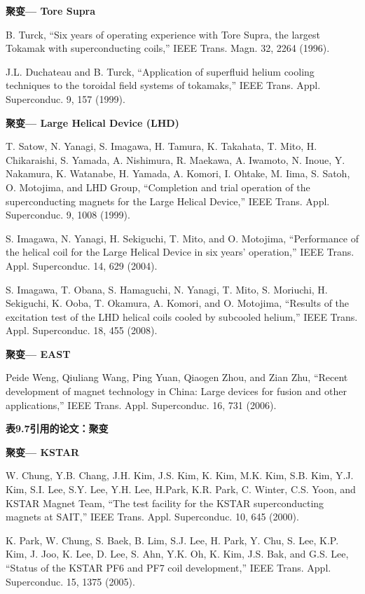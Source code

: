 \noindent \textbf{聚变--- Tore Supra }

\noindent [9.30] B. Turck, ``Six years of operating experience with Tore Supra, the largest Tokamak
with superconducting coils,” IEEE Trans. Magn. 32, 2264 (1996).

\noindent [9.31] J.L. Duchateau and B. Turck, ``Application of superfluid helium cooling techniques
to the toroidal field systems of tokamaks,” IEEE Trans. Appl. Superconduc. 9, 157
(1999).

\noindent \textbf{聚变--- Large Helical Device (LHD) }

\noindent [9.32] T. Satow, N. Yanagi, S. Imagawa, H. Tamura, K. Takahata, T. Mito, H. Chikaraishi,
S. Yamada, A. Nishimura, R. Maekawa, A. Iwamoto, N. Inoue, Y. Nakamura,
K. Watanabe, H. Yamada, A. Komori, I. Ohtake, M. Iima, S. Satoh, O. Motojima,
and LHD Group, ``Completion and trial operation of the superconducting magnets
for the Large Helical Device,” IEEE Trans. Appl. Superconduc. 9, 1008 (1999).

\noindent [9.33] S. Imagawa, N. Yanagi, H. Sekiguchi, T. Mito, and O. Motojima, ``Performance of
the helical coil for the Large Helical Device in six years’ operation,” IEEE Trans.
Appl. Superconduc. 14, 629 (2004).

\noindent [9.34] S. Imagawa, T. Obana, S. Hamaguchi, N. Yanagi, T. Mito, S. Moriuchi, H. Sekiguchi,
K. Ooba, T. Okamura, A. Komori, and O. Motojima, ``Results of the excitation
test of the LHD helical coils cooled by subcooled helium,” IEEE Trans.
Appl. Superconduc. 18, 455 (2008).

\noindent \textbf{聚变--- EAST}

\noindent [9.35] Peide Weng, Qiuliang Wang, Ping Yuan, Qiaogen Zhou, and Zian Zhu, ``Recent development of magnet technology in China: Large devices for fusion and other applications,” IEEE Trans. Appl. Superconduc. 16, 731 (2006).

\noindent \textbf{表9.7引用的论文：聚变}

\noindent \textbf{聚变--- KSTAR }

\noindent [9.36] W. Chung, Y.B. Chang, J.H. Kim, J.S. Kim, K. Kim, M.K. Kim, S.B. Kim,
Y.J. Kim, S.I. Lee, S.Y. Lee, Y.H. Lee, H.Park, K.R. Park, C. Winter, C.S. Yoon,
and KSTAR Magnet Team, ``The test facility for the KSTAR superconducting
magnets at SAIT,” IEEE Trans. Appl. Superconduc. 10, 645 (2000).

\noindent [9.37] K. Park, W. Chung, S. Baek, B. Lim, S.J. Lee, H. Park, Y. Chu, S. Lee, K.P. Kim,
J. Joo, K. Lee, D. Lee, S. Ahn, Y.K. Oh, K. Kim, J.S. Bak, and G.S. Lee, ``Status
of the KSTAR PF6 and PF7 coil development,” IEEE Trans. Appl. Superconduc.
15, 1375 (2005).

